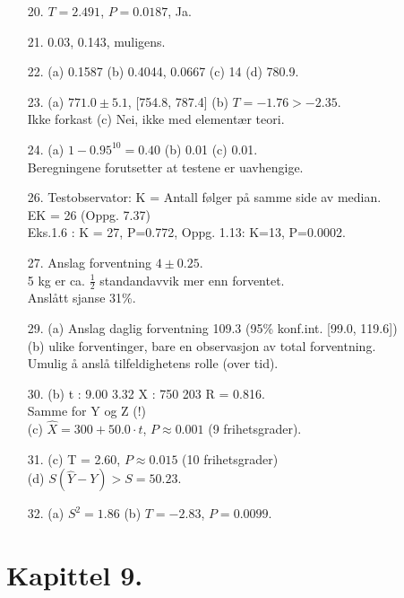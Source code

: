 \begin{itemize}
\item[20.]  $T=2.491$,   $P=0.0187$,  Ja.                   
\item[21.] 0.03, 0.143, muligens.
\item[22.]  (a) 0.1587   (b) 0.4044, 0.0667   (c) 14   (d) 780.9.
\item[23.]  (a) $771.0 \pm 5.1$, [754.8, 787.4]   (b) $T=-1.76 > -2.35$.\\
              Ikke forkast   (c) Nei, ikke med elementær teori.
\item[24.]  (a) $1-0.95^{10}   = 0.40 $  (b) 0.01   (c) 0.01.\\
              Beregningene forutsetter at testene er uavhengige.
\item[26.] Testobservator: K = Antall følger på samme side av median.\\
           EK = 26 (Oppg. 7.37) \\
           Eks.1.6 : K = 27, P=0.772, Oppg. 1.13: K=13, P=0.0002.  
\item[27.] Anslag forventning $4\pm 0.25$.\\
           5 kg er ca. $\frac{1}{2}$ standandavvik mer enn forventet.\\
           Anslått sjanse 31\%.
\item[29.] (a) Anslag daglig forventning 109.3 (95\% konf.int. [99.0, 119.6])\\
           (b) ulike forventinger, bare en observasjon av total forventning.\\
               Umulig å anslå tilfeldighetens rolle (over tid).\\
\item[30.]  (b) t : 9.00 3.32  X : 750 203  R = 0.816.\\
              Samme for Y og Z (!)\\
              (c) $\hat{X} = 300 + 50.0\cdot t$, 
                       $P \approx 0.001$ (9 frihetsgrader). \\        
\item[31.]  (c) T = 2.60, $P \approx 0.015$ (10 frihetsgrader)\\
              (d) $S(\hat{Y}-Y) > S = 50.23$.
\item[32.]  (a) $S^2 = 1.86$   (b) $T = -2.83$,  $P = 0.0099$.
\end{itemize}         
         
\section*{Kapittel 9.}                                      

